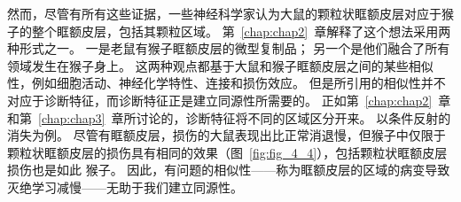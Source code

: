 然而，尽管有所有这些证据，一些神经科学家认为大鼠的颗粒状眶额皮层对应于猴子的整个眶额皮层，包括其颗粒区域\cite{uylings2003rats,seamans2008comparing,schoenbaum2009new}。
第~\ref{chap:chap2}~章解释了这个想法采用两种形式之一。
一是老鼠有猴子眶额皮层的微型复制品；
另一个是他们融合了所有领域发生在猴子身上。
这两种观点都基于大鼠和猴子眶额皮层之间的某些相似性，例如细胞活动、神经化学特性、连接和损伤效应。
但是所引用的相似性并不对应于诊断特征，而诊断特征正是建立同源性所需要的。
正如第~\ref{chap:chap2}~章和第~\ref{chap:chap3}~章所讨论的，诊断特征将不同的区域区分开来。
以条件反射的消失为例。
尽管有眶额皮层，损伤的大鼠表现出比正常消退慢\cite{kolb1974double}，但猴子中仅限于颗粒状眶额皮层的损伤具有相同的效果\cite{izquierdo2005comparison}（图~\ref{fig:fig_4_4}），包括颗粒状眶额皮层损伤也是如此 猴子\cite{butter1969perseveration}。
因此，有问题的相似性——称为眶额皮层的区域的病变导致灭绝学习减慢——无助于我们建立同源性。\par


